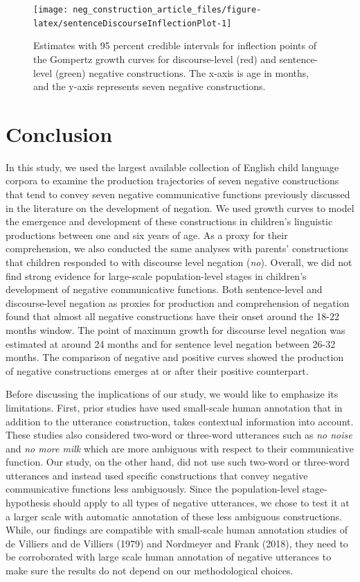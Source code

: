 \documentclass[
  man,floatsintext]{apa6}
\begin{document}
\begin{figure}[H]

{\centering \texttt{[image: neg\_construction\_article\_files/figure-latex/sentenceDiscourseInflectionPlot-1]} 

}

\caption{Estimates with 95 percent credible intervals for inflection points of the Gompertz growth curves for discourse-level (red) and sentence-level (green) negative constructions. The x-axis is age in months, and the y-axis represents seven negative constructions.}\label{fig:sentenceDiscourseInflectionPlot}
\end{figure}

\section{Conclusion}\label{conclusion}

In this study, we used the largest available collection of English child language corpora to examine the production trajectories of seven negative constructions that tend to convey seven negative communicative functions previously discussed in the literature on the development of negation. We used growth curves to model the emergence and development of these constructions in children's linguistic productions between one and six years of age. As a proxy for their comprehension, we also conducted the same analyses with parents' constructions that children responded to with discourse level negation (\emph{no}). Overall, we did not find strong evidence for large-scale population-level stages in children's development of negative communicative functions. Both sentence-level and discourse-level negation as proxies for production and comprehension of negation found that almost all negative constructions have their onset around the 18-22 months window. The point of maximum growth for discourse level negation was estimated at around 24 months and for sentence level negation between 26-32 months. The comparison of negative and positive curves showed the production of negative constructions emerges at or after their positive counterpart.

Before discussing the implications of our study, we would like to emphasize its limitations. First, prior studies have used small-scale human annotation that in addition to the utterance construction, takes contextual information into account. These studies also considered two-word or three-word utterances such as \emph{no noise} and \emph{no more milk} which are more ambiguous with respect to their communicative function. Our study, on the other hand, did not use such two-word or three-word utterances and instead used specific constructions that convey negative communicative functions less ambiguously. Since the population-level stage-hypothesis should apply to all types of negative utterances, we chose to test it at a larger scale with automatic annotation of these less ambiguous constructions. While, our findings are compatible with small-scale human annotation studies of de Villiers and de Villiers (1979) and Nordmeyer and Frank (2018), they need to be corroborated with large scale human annotation of negative utterances to make sure the results do not depend on our methodological choices.
\end{document}
